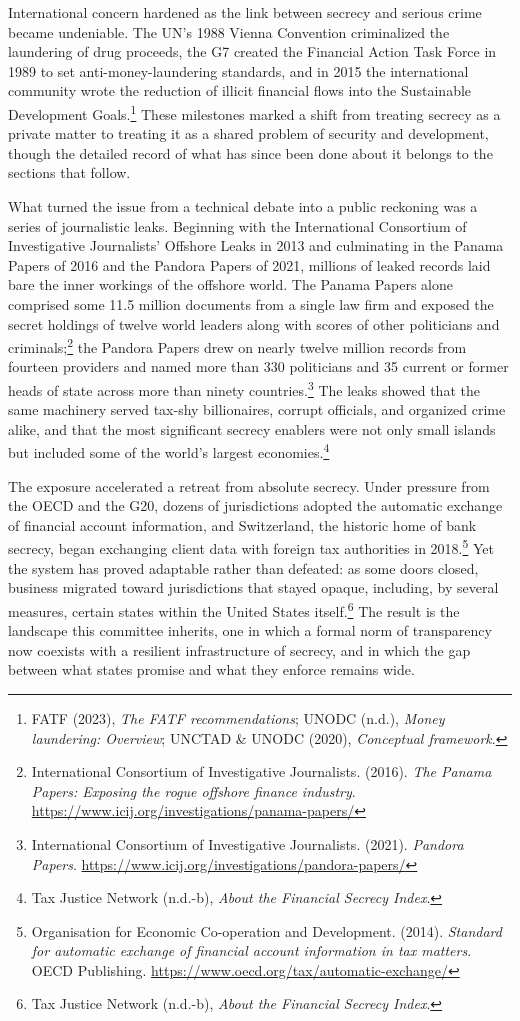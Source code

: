International concern hardened as the link between secrecy and serious crime became undeniable. The UN’s 1988 Vienna Convention criminalized the laundering of drug proceeds, the G7 created the Financial Action Task Force in 1989 to set anti-money-laundering standards, and in 2015 the international community wrote the reduction of illicit financial flows into the Sustainable Development Goals.\footnote{FATF (2023), \emph{The FATF recommendations}; UNODC (n.d.), \emph{Money laundering: Overview}; UNCTAD \& UNODC (2020), \emph{Conceptual framework}.} These milestones marked a shift from treating secrecy as a private matter to treating it as a shared problem of security and development, though the detailed record of what has since been done about it belongs to the sections that follow.

What turned the issue from a technical debate into a public reckoning was a series of journalistic leaks. Beginning with the International Consortium of Investigative Journalists’ Offshore Leaks in 2013 and culminating in the Panama Papers of 2016 and the Pandora Papers of 2021, millions of leaked records laid bare the inner workings of the offshore world. The Panama Papers alone comprised some 11.5 million documents from a single law firm and exposed the secret holdings of twelve world leaders along with scores of other politicians and criminals;\footnote{International Consortium of Investigative Journalists. (2016). \emph{The Panama Papers: Exposing the rogue offshore finance industry}. \url{https://www.icij.org/investigations/panama-papers/}} the Pandora Papers drew on nearly twelve million records from fourteen providers and named more than 330 politicians and 35 current or former heads of state across more than ninety countries.\footnote{International Consortium of Investigative Journalists. (2021). \emph{Pandora Papers}. \url{https://www.icij.org/investigations/pandora-papers/}} The leaks showed that the same machinery served tax-shy billionaires, corrupt officials, and organized crime alike, and that the most significant secrecy enablers were not only small islands but included some of the world’s largest economies.\footnote{Tax Justice Network (n.d.-b), \emph{About the Financial Secrecy Index}.}

The exposure accelerated a retreat from absolute secrecy. Under pressure from the OECD and the G20, dozens of jurisdictions adopted the automatic exchange of financial account information, and Switzerland, the historic home of bank secrecy, began exchanging client data with foreign tax authorities in 2018.\footnote{Organisation for Economic Co-operation and Development. (2014). \emph{Standard for automatic exchange of financial account information in tax matters}. OECD Publishing. \url{https://www.oecd.org/tax/automatic-exchange/}} Yet the system has proved adaptable rather than defeated: as some doors closed, business migrated toward jurisdictions that stayed opaque, including, by several measures, certain states within the United States itself.\footnote{Tax Justice Network (n.d.-b), \emph{About the Financial Secrecy Index}.} The result is the landscape this committee inherits, one in which a formal norm of transparency now coexists with a resilient infrastructure of secrecy, and in which the gap between what states promise and what they enforce remains wide.
